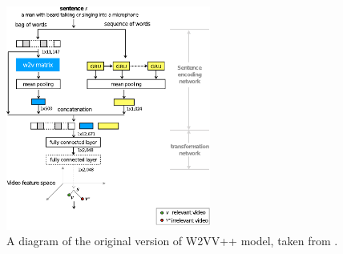 \begin{figure}
    \centering
    \includegraphics[width=0.6\textwidth]{img/w2vvpp_converted.pdf}
    \caption[A diagram of W2VV++ model]{A diagram of the original version of W2VV++ model, taken from \cite{XirongW2VVpp}.}
    \label{fig:w2vvpp_original_sketch}
\end{figure}

